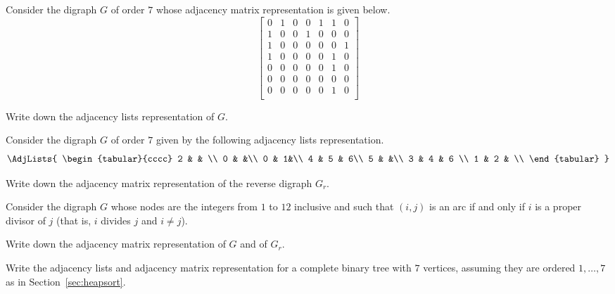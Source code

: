 \begin{Exercise}
\label{ex:matrix2list}

Consider the digraph $G$ of order $7$ whose adjacency matrix 
representation is given below. 
\newline
$$
\left[
\begin{matrix}
0 & 1 & 0 & 0 & 1 & 1 & 0 \\
1 & 0 & 0 & 1 & 0 & 0 & 0 \\
1 & 0 & 0 & 0 & 0 & 0 & 1 \\
1 & 0 & 0 & 0 & 0 & 1 & 0 \\
0 & 0 & 0 & 0 & 0 & 1 & 0 \\
0 & 0 & 0 & 0 & 0 & 0 & 0 \\
0 & 0 & 0 & 0 & 0 & 1 & 0 \\
\end{matrix}
\right]
$$

Write down the adjacency lists representation of $G$.

\end{Exercise}

\begin{Exercise}
\label{ex:listreverse}

Consider the digraph $G$ of order $7$ given by the following 
adjacency lists representation.
$$
\AdjLists{
\begin{tabular}{cccc}
2 &  & \\
0 & &\\
0 & 1&\\   
4 & 5 & 6\\
5 & &\\
3 & 4 & 6 \\
1 & 2 & \\
\end{tabular}
}
$$

Write down the adjacency matrix representation of the reverse digraph
$G_r$.

\end{Exercise}

\begin{Exercise}
\label{ex:divisible}

Consider the digraph $G$ whose nodes are the integers from $1$ to $12$
inclusive and such that $(i, j)$ is an arc if and only if $i$ is a
proper divisor of $j$ (that is, $i$ divides $j$ and $i\neq j$).

Write down the adjacency matrix representation of $G$ and of $G_r$.
\end{Exercise}

\begin{Exercise} \label{ex:heaprep} 
Write the adjacency lists
and adjacency matrix representation for a complete binary tree
with $7$ vertices, assuming they are ordered $1, \dots, 7$ as in
Section~\ref{sec:heapsort}.
\end{Exercise}


